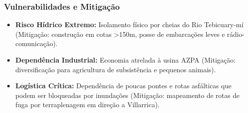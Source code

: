 \subsubsection{Vulnerabilidades e
Mitigação}

\begin{itemize}
\tightlist
\item
  \textbf{Risco Hídrico Extremo:} Isolamento físico por cheias do Rio
  Tebicuary-mí (Mitigação: construção em cotas \textgreater150m, posse
  de embarcações leves e rádio-comunicação).
\item
  \textbf{Dependência Industrial:} Economia atrelada à usina AZPA
  (Mitigação: diversificação para agricultura de subsistência e pequenos
  animais).
\item
  \textbf{Logística Crítica:} Dependência de poucas pontes e rotas
  asfálticas que podem ser bloqueadas por inundações (Mitigação:
  mapeamento de rotas de fuga por terraplenagem em direção a
  Villarrica).
\end{itemize}

